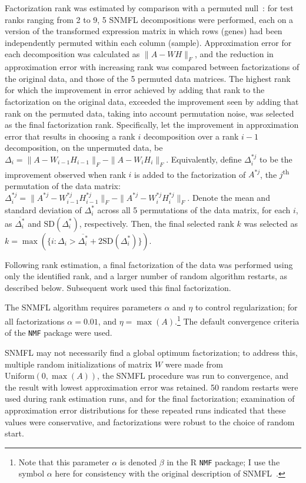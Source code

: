 \documentclass[dissertation.tex]{subfiles}
\begin{document}
Factorization rank was estimated by comparison with a permuted null~\cite{Frigyesi2008}: for test ranks ranging from 2 to 9, 5 \gls{SNMFL} decompositions were performed, each on a version of the transformed expression matrix in which rows (genes) had been independently permuted within each column (sample).  Approximation error for each decomposition was calculated as $\|A - W H\|_F$, and the reduction in approximation error with increasing rank was compared between factorizations of the original data, and those of the 5 permuted data matrices.  The highest rank for which the improvement in error achieved by adding that rank to the factorization on the original data, exceeded the improvement seen by adding that rank on the permuted data, taking into account permutation noise, was selected as the final factorization rank.  Specifically, let the improvement in approximation error that results in choosing a rank $i$ decomposition over a rank $i-1$ decomposition, on the unpermuted data, be $\Delta_i = \|A - W_{i-1} H_{i-1}\|_F - \|A - W_{i} H_{i}\|_F$.  Equivalently, define $\Delta^{*j}_i$ to be the improvement observed when rank $i$ is added to the factorization of $A^{*j}$, the $j$\textsuperscript{th} permutation of the data matrix: $\Delta^{*j}_i = \|A^{*j} - W^{*j}_{i-1} H^{*j}_{i-1}\|_F - \|A^{*j} - W^{*j}_{i} H^{*j}_{i}\|_F$.  Denote the mean and standard deviation of $\Delta^{*}_i$ across all 5 permutations of the data matrix, for each $i$, as $\overline{\Delta^{*}_i}$ and $\text{SD}(\Delta^{*}_i)$, respectively.  Then, the final selected rank $k$ was selected as $k = \max(\{i : \Delta_i > \overline{\Delta^{*}_i} + 2 \text{SD}(\Delta^{*}_i)\})$.

Following rank estimation, a final factorization of the data was performed using only the identified rank, and a larger number of random algorithm restarts, as described below.  Subsequent work used this final factorization.

The \gls{SNMFL} algorithm requires parameters $\alpha$ and $\eta$ to control regularization; for all factorizations $\alpha = 0.01$, and $\eta = \max(A)$.\footnote{Note that this parameter $\alpha$ is denoted $\beta$ in the R \texttt{NMF} package; I use the symbol $\alpha$ here for consistency with the original description of \gls{SNMFL}~\cite{Kim2007}.}  The default convergence criteria of the \texttt{NMF} package were used.

\gls{SNMFL} may not necessarily find a global optimum factorization; to address this, multiple random initializations of matrix $W$ were made from $\text{Uniform}(0, \max(A))$, the \gls{SNMFL} procedure was run to convergence, and the result with lowest approximation error was retained.  50 random restarts were used during rank estimation runs, and  for the final factorization; examination of approximation error distributions for these repeated runs indicated that these values were conservative, and factorizations were robust to the choice of random start.
\end{document}
